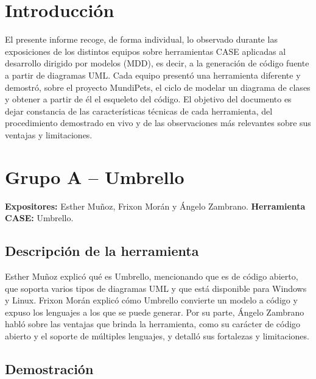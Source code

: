 \documentclass[journal,onecolumn]{IEEEtran}
\begin{document}
	\tableofcontents
	\newpage
	\listoftables
	\newpage
	
	\section{Introducción}
	
	El presente informe recoge, de forma individual, lo observado durante las exposiciones de los distintos equipos sobre herramientas CASE aplicadas al desarrollo dirigido por modelos (MDD), es decir, a la generación de código fuente a partir de diagramas UML. Cada equipo presentó una herramienta diferente y demostró, sobre el proyecto MundiPets, el ciclo de modelar un diagrama de clases y obtener a partir de él el esqueleto del código. El objetivo del documento es dejar constancia de las características técnicas de cada herramienta, del procedimiento demostrado en vivo y de las observaciones más relevantes sobre sus ventajas y limitaciones.
	
	\section{Grupo A -- Umbrello}
	
	\textbf{Expositores:} Esther Muñoz, Frixon Morán y Ángelo Zambrano. \quad \textbf{Herramienta CASE:} Umbrello.
	
	\subsection{Descripción de la herramienta}
	
	Esther Muñoz explicó qué es Umbrello, mencionando que es de código abierto, que soporta varios tipos de diagramas UML y que está disponible para Windows y Linux. Frixon Morán explicó cómo Umbrello convierte un modelo a código y expuso los lenguajes a los que se puede generar. Por su parte, Ángelo Zambrano habló sobre las ventajas que brinda la herramienta, como su carácter de código abierto y el soporte de múltiples lenguajes, y detalló sus fortalezas y limitaciones.
	
	\subsection{Demostración}
	
\end{document}
